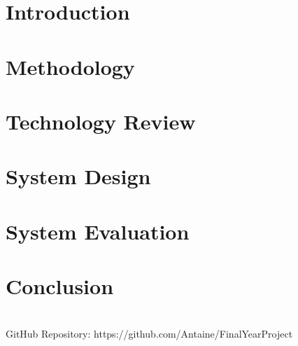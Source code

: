 \documentclass{report}
\begin{document}
\chapter{Introduction}


\chapter{Methodology}


\chapter{Technology Review}


\chapter{System Design}


\chapter{System Evaluation}


\chapter{Conclusion}





\appendix
\chapter{}
GitHub Repository: https://github.com/Antaine/FinalYearProject
\end{document}

